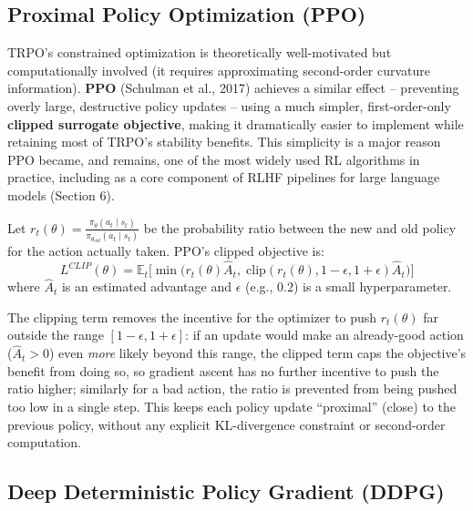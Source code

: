 \documentclass[12pt,a4paper]{article}
\begin{document}
\subsection{Proximal Policy Optimization (PPO)}

\begin{keyidea}
TRPO's constrained optimization is theoretically well-motivated but computationally involved (it requires approximating second-order curvature information). \textbf{PPO} (Schulman et al., 2017) achieves a similar effect -- preventing overly large, destructive policy updates -- using a much simpler, first-order-only \textbf{clipped surrogate objective}, making it dramatically easier to implement while retaining most of TRPO's stability benefits. This simplicity is a major reason PPO became, and remains, one of the most widely used RL algorithms in practice, including as a core component of RLHF pipelines for large language models (Section 6).
\end{keyidea}

\begin{defbox}
Let $r_t(\theta) = \frac{\pi_\theta(a_t\mid s_t)}{\pi_{\theta_{old}}(a_t\mid s_t)}$ be the probability ratio between the new and old policy for the action actually taken. PPO's clipped objective is:
\[
L^{CLIP}(\theta) = \mathbb{E}_t\Big[\min\big(r_t(\theta)\hat A_t,\; \text{clip}(r_t(\theta), 1-\epsilon, 1+\epsilon)\hat A_t\big)\Big]
\]
where $\hat A_t$ is an estimated advantage and $\epsilon$ (e.g., $0.2$) is a small hyperparameter.
\end{defbox}

\begin{keyidea}
The clipping term removes the incentive for the optimizer to push $r_t(\theta)$ far outside the range $[1-\epsilon, 1+\epsilon]$: if an update would make an already-good action ($\hat A_t > 0$) even \emph{more} likely beyond this range, the clipped term caps the objective's benefit from doing so, so gradient ascent has no further incentive to push the ratio higher; similarly for a bad action, the ratio is prevented from being pushed too low in a single step. This keeps each policy update ``proximal'' (close) to the previous policy, without any explicit KL-divergence constraint or second-order computation.
\end{keyidea}

\subsection{Deep Deterministic Policy Gradient (DDPG)}
\end{document}

